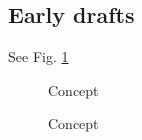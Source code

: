 \documentclass{article}
\begin{document}
\clearpage

    \subsection{Early drafts}
        See Fig. \ref{fig:concepts}
        \begin{figure}[h]
            \caption{Concept}
            \label{fig:concepts}
            \caption{Concept}
            \label{fig:concepts}
        \end{figure}

\clearpage
\end{document}
